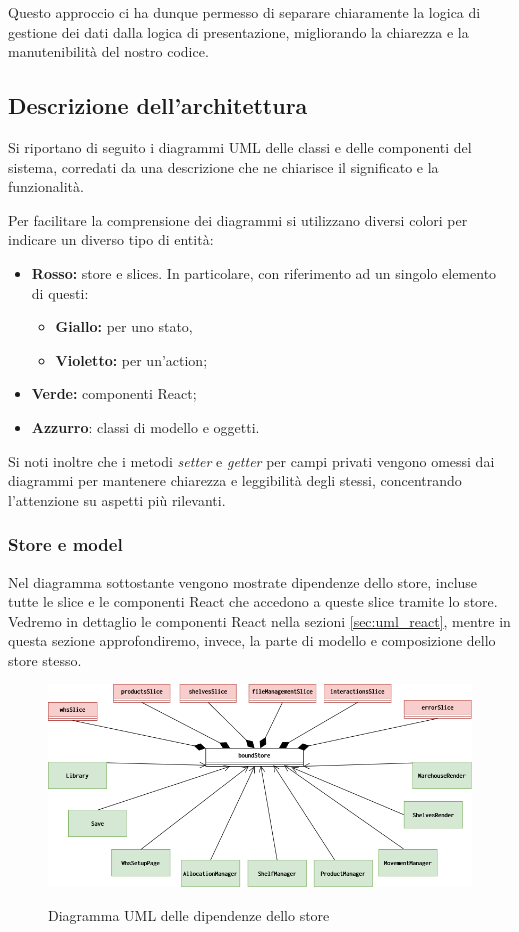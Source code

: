 Questo approccio ci ha dunque permesso di separare chiaramente la logica di gestione dei dati dalla logica di presentazione, migliorando la chiarezza e la manutenibilità del nostro codice. 

\subsection{Descrizione dell'architettura}
Si riportano di seguito i diagrammi UML delle classi e delle componenti del sistema, corredati da una descrizione che ne chiarisce il significato e la funzionalità. 

Per facilitare la comprensione dei diagrammi si utilizzano diversi colori per indicare un diverso tipo di entità:
\begin{itemize}
    \item \colorbox{rosso_uml}{\textbf{Rosso:}} store e slices. In particolare, con riferimento ad un singolo elemento di questi:
        \begin{itemize}
            \item \colorbox{giallo_uml}{\textbf{Giallo:}} per uno stato,
            \item \colorbox{viola_uml}{\textbf{Violetto:}} per un'action;
        \end{itemize}
    \item \colorbox{verde_uml}{\textbf{Verde:}} componenti React;
    \item \colorbox{azzurro_uml}{\textbf{Azzurro}:} classi di modello e oggetti.
\end{itemize}

Si noti inoltre che i metodi \textit{setter} e \textit{getter} per campi privati vengono omessi dai diagrammi per mantenere chiarezza e leggibilità degli stessi, concentrando l'attenzione su aspetti più rilevanti.

\subsubsection{Store e model} 
Nel diagramma sottostante vengono mostrate dipendenze dello store, incluse tutte le slice e le componenti React che accedono a queste slice tramite lo store. Vedremo in dettaglio le componenti React nella sezioni \ref{sec:uml_react}, mentre in questa sezione approfondiremo, invece, la parte di modello e composizione dello store stesso.
\begin{figure}[H]
    \centering
    \includegraphics[width=\textwidth]{images/UML/feature_model_general.drawio.png}
    \label{fig:UML_model}
    \caption{Diagramma UML delle dipendenze dello store}
\end{figure}

